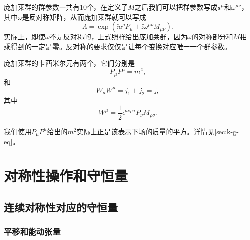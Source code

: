 庞加莱群的群参数一共有10个，在定义了$M$之后我们可以把群参数写成$a^\mu$和$\omega^{\mu \nu}$，其中$\omega$是反对称矩阵，从而庞加莱群就可以写成
\[
    \Lambda = \exp \left( \ii a^\mu P_\mu + \ii \omega^{\mu \nu} M_{\mu \nu} \right).
\]
实际上，即使$\omega$不是反对称的，上式照样给出庞加莱群，因为$\omega$的对称部分和$M$相乘得到的一定是零。反对称的要求仅仅是让每个变换对应唯一一个群参数。

庞加莱群的卡西米尔元有两个，它们分别是
\begin{equation}
    P_\mu P^\mu = m^2,
    \label{eq:momentum-and-mass}
\end{equation}
和
\begin{equation}
    W_\mu W^\mu = j_1 + j_2 = j,
\end{equation}
其中
\begin{equation}
    W^\mu = \frac{1}{2} \epsilon^{\mu \nu \rho \sigma} P_\nu M_{\rho \sigma}.
\end{equation}

我们使用$P_\mu P^\mu$给出的$m^2$实际上正是该表示下场的质量的平方。详情见\autoref{sec:k-g-eq}。

\section{对称性操作和守恒量}

\subsection{连续对称性对应的守恒量}\label{sec:continuous-conservation-general}

\subsubsection{平移和能动张量}

